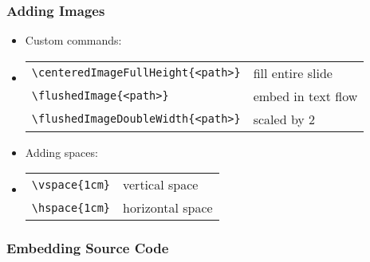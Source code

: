 \begin{slide}[fragile]
  \frametitle{Adding Images}
  \begin{itemize}
    \item Custom commands:
    \item[]
      \begin{tabular}{l|l}
        \footnotesize{\verb^\centeredImageFullHeight{<path>}^} & fill entire slide  \\
        \footnotesize{\verb^\flushedImage{<path>}^           } & embed in text flow \\
        \footnotesize{\verb^\flushedImageDoubleWidth{<path>}^} & scaled by 2        \\
      \end{tabular}
    \item Adding spaces:
    \item[]
    \begin{tabular}{l|l}
      \footnotesize{\verb^\vspace{1cm}^} & vertical space   \\
      \footnotesize{\verb^\hspace{1cm}^} & horizontal space \\
    \end{tabular}
  \end{itemize}
\end{slide}

\begin{slide}[fragile]
  \frametitle{Embedding Source Code}
\end{slide}

